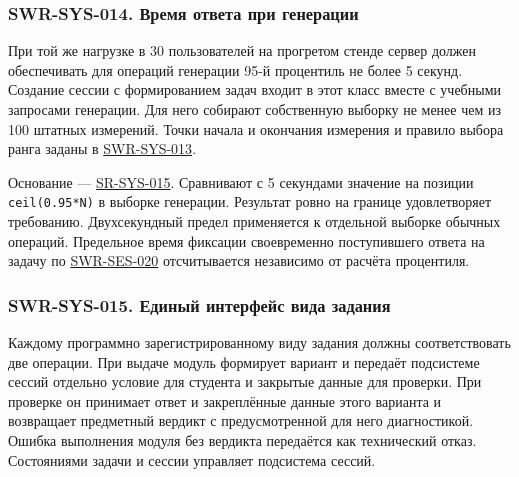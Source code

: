 \documentclass[12pt,a4paper]{article}
\begin{document}
\subsubsection{SWR-SYS-014. Время ответа при генерации}\label{swr-sys-014-ux432ux440ux435ux43cux44f-ux43eux442ux432ux435ux442ux430-ux43fux440ux438-ux433ux435ux43dux435ux440ux430ux446ux438ux438}

\hypertarget{swr-sys-014-время-ответа-при-генерации}{}

\hypertarget{swr-sys-014}{}

При той же нагрузке в 30 пользователей на прогретом стенде сервер должен обеспечивать для операций генерации 95-й процентиль не более 5 секунд. Создание сессии с формированием задач входит в этот класс вместе с учебными запросами генерации. Для него собирают собственную выборку не менее чем из 100 штатных измерений. Точки начала и окончания измерения и правило выбора ранга заданы в {\hyperlink{swr-sys-013}{SWR-SYS-013}}.

Основание --- {\href{../04\_Системные\_требования/DOC-05\_Системные\_требования.pdf\#sr-sys-015}{SR-SYS-015}}. Сравнивают с 5 секундами значение на позиции \texttt{ceil(0.\allowbreak{}95*N)} в выборке генерации. Результат ровно на границе удовлетворяет требованию. Двухсекундный предел применяется к отдельной выборке обычных операций. Предельное время фиксации своевременно поступившего ответа на задачу по {\href{DOC-06.2\_Сессии\_задач\_и\_планировщик.pdf\#swr-ses-020}{SWR-SES-020}} отсчитывается независимо от расчёта процентиля.

\subsubsection{SWR-SYS-015. Единый интерфейс вида задания}\label{swr-sys-015-ux435ux434ux438ux43dux44bux439-ux438ux43dux442ux435ux440ux444ux435ux439ux441-ux432ux438ux434ux430-ux437ux430ux434ux430ux43dux438ux44f}

\hypertarget{swr-sys-015-единый-интерфейс-вида-задания}{}

\hypertarget{swr-sys-015}{}

Каждому программно зарегистрированному виду задания должны соответствовать две операции. При выдаче модуль формирует вариант и передаёт подсистеме сессий отдельно условие для студента и закрытые данные для проверки. При проверке он принимает ответ и закреплённые данные этого варианта и возвращает предметный вердикт с предусмотренной для него диагностикой. Ошибка выполнения модуля без вердикта передаётся как технический отказ. Состояниями задачи и сессии управляет подсистема сессий.
\end{document}
